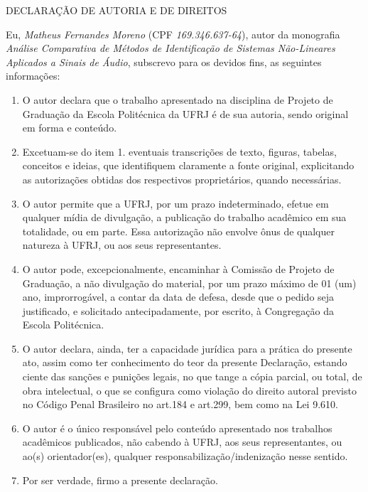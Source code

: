 \pagebreak
\pagestyle{plain}
\begin{center}
DECLARAÇÃO DE AUTORIA E DE DIREITOS
\end{center}

\vspace{0.5cm}

Eu, \emph{Matheus Fernandes Moreno} (CPF \emph{169.346.637-64}), autor da monografia \emph{Análise Comparativa de Métodos de Identificação de Sistemas Não-Lineares Aplicados a Sinais de Áudio}, subscrevo para os devidos fins, as seguintes informações:

\begin{enumerate}
    \item O autor declara que o trabalho apresentado na disciplina de Projeto de Graduação da Escola Politécnica da UFRJ é de sua autoria, sendo original em forma e conteúdo.
    \item Excetuam-se do item 1. eventuais transcrições de texto, figuras, tabelas, conceitos e ideias, que identifiquem claramente a fonte original, explicitando as autorizações obtidas dos respectivos proprietários, quando necessárias.
    \item O autor permite que a UFRJ, por um prazo indeterminado, efetue em qualquer mídia de divulgação, a publicação do trabalho acadêmico em sua totalidade, ou em parte. Essa autorização não envolve ônus de qualquer natureza à UFRJ, ou aos seus representantes.
    \item O autor pode, excepcionalmente, encaminhar à Comissão de Projeto de Graduação, a não divulgação do material, por um prazo máximo de 01 (um) ano, improrrogável, a contar da data de defesa, desde que o pedido seja justificado, e solicitado antecipadamente, por escrito, à Congregação da Escola Politécnica.
    \item O autor declara, ainda, ter a capacidade jurídica para a prática do presente ato, assim como ter conhecimento do teor da presente Declaração, estando ciente das sanções e punições legais, no que tange a cópia parcial, ou total, de obra intelectual, o que se configura como violação do direito autoral previsto no Código Penal Brasileiro no art.184 e art.299, bem como na Lei 9.610.
    \item O autor é o único responsável pelo conteúdo apresentado nos trabalhos acadêmicos publicados, não cabendo à UFRJ, aos seus representantes,  ou ao(s) orientador(es), qualquer responsabilização/indenização nesse sentido.
    \item Por ser verdade, firmo a presente declaração.
\end{enumerate}

\vspace{0.75cm}
\begin{flushright}
\parbox{10cm}{
    \hrulefill

    \vspace{-0.2cm}

    \vspace{0.1cm}
}
\end{flushright}
